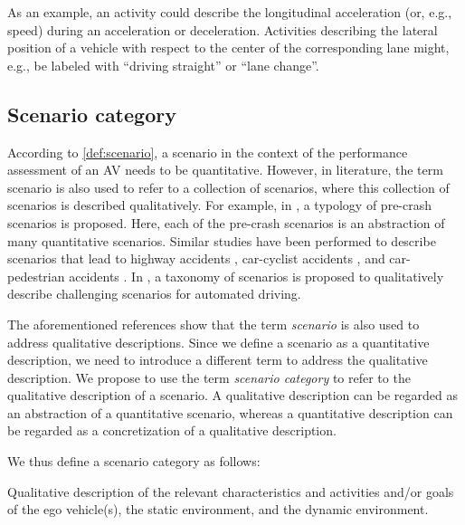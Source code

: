 \cstartf As an example, an activity could describe the longitudinal acceleration (or, e.g., speed) during an acceleration or deceleration. \cendf
Activities describing the lateral position of a vehicle with respect to the center of the corresponding lane might, e.g., be labeled with ``driving straight'' or ``lane change''.




\subsection{Scenario category}
\label{sec:scenario category}

\cstartd According to \cendd \cref{def:scenario}, a scenario in the context of the performance assessment of an AV needs to be quantitative. 
However, in literature, the term scenario is also used to refer to a collection of scenarios, where this collection of scenarios is described \cstartd qualitatively\cendd. For example, in \autocite{USDoT2007precrashscenarios}, a typology of pre-crash scenarios is proposed. Here, each of the pre-crash scenarios is an abstraction of many quantitative scenarios. Similar studies have been performed to describe scenarios that lead to highway accidents \autocite{adaptive2017d73}, car-cyclist accidents \autocite{opdencamp2014cats}, and car-pedestrian accidents \autocite{lenard2014typical}. In \autocite{catapult2017taxonomy}, a taxonomy of scenarios is proposed to qualitatively describe challenging scenarios for automated driving.

The aforementioned references \autocite{USDoT2007precrashscenarios, adaptive2017d73, opdencamp2014cats, lenard2014typical, catapult2017taxonomy} show that the term \emph{scenario} is also used to address qualitative descriptions. Since we define a scenario as a quantitative description, we need to introduce a different term to address the qualitative description. We propose to use the term \emph{scenario category} to refer to the qualitative description of a scenario. A qualitative description can be regarded as an abstraction of a quantitative scenario, whereas a quantitative description can be regarded as a concretization of a qualitative description.

We thus define a scenario category as follows:
\begin{definition} \label{def:scenario category}	
	\cstartd Qualitative description of the relevant characteristics and activities and/or goals of the ego vehicle(s), the static environment, and the dynamic environment. \cendd
\end{definition}

